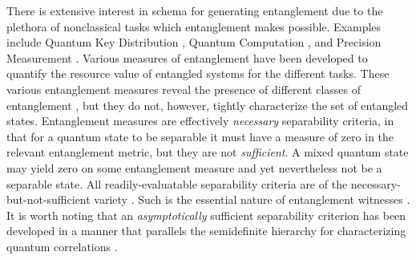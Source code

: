 \documentclass[
  12pt          %
  ,letterpaper  %
  ,center       %
  ,noupper      %
  ,english,fleqn]{uconnthesis}
\begin{document}
There is extensive interest in schema for generating entanglement \cite{DownConversion,ResonantFluorescence,DickePrepration,SpinEntanglementMorrison,TothDickePRL} due to the plethora of nonclassical tasks which entanglement makes possible. Examples include Quantum Key Distribution \cite{CryptoPRA,CryptoPRL,CryptoDIQKD,RenatoQKDNature,DickeNetworking}, Quantum Computation \cite{mosca_algorithms_revisited,MBQC,MBQC2,QuantOptBook,Schumacher2010Quantum,Nielsen2011Quantum,Wilde2013Quantum}, and Precision Measurement \cite{SpinSqueezing2001,TothSpinSqueezing,NoriSpinSqueezing,Gross2010Nature,PrecisionToth,Gross2012IOP,FisherPrecisionMeasurement}. Various measures of entanglement \cite{TothDickePRL,DickeEntanglement,OneNegativeEigenvalue,NegativityIntro,NilpotentReview,GeomQuantStatesBook,PlenioEntanglementMeasures,multireview,entang.review.toth,SymmetricEquivalents,MultipartiteConc,ConvVsNeg,ConcVsGeom,Geometric3Qubits,GeometricMultiQubit,SteeringEntanglement} have been developed to quantify the resource value of entangled systems for the different tasks. These various entanglement measures reveal the presence of different classes of entanglement \cite{3Qubits2Ways,ThreeQubitClassification04,ThreeQubitClassification06,ClassificationHyperdeterminants,NQubitEquivalences,characterizingentanglement}, but they do not, however, tightly characterize the set of entangled states. Entanglement measures are effectively {\em necessary} separability criteria, in that for a quantum state to be separable it must have a measure of zero in the relevant entanglement metric, but they are not {\em sufficient}. A mixed quantum state may yield zero on some entanglement measure and yet nevertheless not be a separable state. All readily-evaluatable separability criteria are of the necessary-but-not-sufficient variety \cite{PPTAsher,PPTHorodecki,PPTNonlocal,ppt4qubit,pptNqubit}. Such is the essential nature of entanglement witnesses \cite{UPBOriginal,UnifiedCorrelations,EntangWitnessExtend}. It is worth noting that an \emph{asymptotically} sufficient separability criterion has been developed \cite{EntanglementHierarchy,EntanglementHierarchyMultipartite} in a manner that parallels the semidefinite hierarchy for characterizing quantum correlations \cite{NPAReview}.
\end{document}
